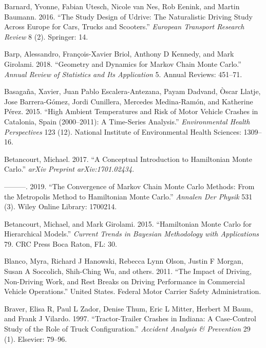 \documentclass[12pt]{book}
\numberwithin{equation}{chapter}
\begin{document}
\leavevmode\hypertarget{ref-barnard2016study}{}%
Barnard, Yvonne, Fabian Utesch, Nicole van Nes, Rob Eenink, and Martin Baumann. 2016. ``The Study Design of Udrive: The Naturalistic Driving Study Across Europe for Cars, Trucks and Scooters.'' \emph{European Transport Research Review} 8 (2). Springer: 14.

\leavevmode\hypertarget{ref-barp2018geometry}{}%
Barp, Alessandro, François-Xavier Briol, Anthony D Kennedy, and Mark Girolami. 2018. ``Geometry and Dynamics for Markov Chain Monte Carlo.'' \emph{Annual Review of Statistics and Its Application} 5. Annual Reviews: 451--71.

\leavevmode\hypertarget{ref-basagana2015high}{}%
Basagaña, Xavier, Juan Pablo Escalera-Antezana, Payam Dadvand, Òscar Llatje, Jose Barrera-Gómez, Jordi Cunillera, Mercedes Medina-Ramón, and Katherine Pérez. 2015. ``High Ambient Temperatures and Risk of Motor Vehicle Crashes in Catalonia, Spain (2000--2011): A Time-Series Analysis.'' \emph{Environmental Health Perspectives} 123 (12). National Institute of Environmental Health Sciences: 1309--16.

\leavevmode\hypertarget{ref-betancourt2017conceptual}{}%
Betancourt, Michael. 2017. ``A Conceptual Introduction to Hamiltonian Monte Carlo.'' \emph{arXiv Preprint arXiv:1701.02434}.

\leavevmode\hypertarget{ref-betancourt2019convergence}{}%
---------. 2019. ``The Convergence of Markov Chain Monte Carlo Methods: From the Metropolis Method to Hamiltonian Monte Carlo.'' \emph{Annalen Der Physik} 531 (3). Wiley Online Library: 1700214.

\leavevmode\hypertarget{ref-betancourt2015hamiltonian}{}%
Betancourt, Michael, and Mark Girolami. 2015. ``Hamiltonian Monte Carlo for Hierarchical Models.'' \emph{Current Trends in Bayesian Methodology with Applications} 79. CRC Press Boca Raton, FL: 30.

\leavevmode\hypertarget{ref-blanco2011impact}{}%
Blanco, Myra, Richard J Hanowski, Rebecca Lynn Olson, Justin F Morgan, Susan A Soccolich, Shih-Ching Wu, and others. 2011. ``The Impact of Driving, Non-Driving Work, and Rest Breaks on Driving Performance in Commercial Vehicle Operations.'' United States. Federal Motor Carrier Safety Administration.

\leavevmode\hypertarget{ref-braver1997tractor}{}%
Braver, Elisa R, Paul L Zador, Denise Thum, Eric L Mitter, Herbert M Baum, and Frank J Vilardo. 1997. ``Tractor-Trailer Crashes in Indiana: A Case-Control Study of the Role of Truck Configuration.'' \emph{Accident Analysis \& Prevention} 29 (1). Elsevier: 79--96.
\end{document}
